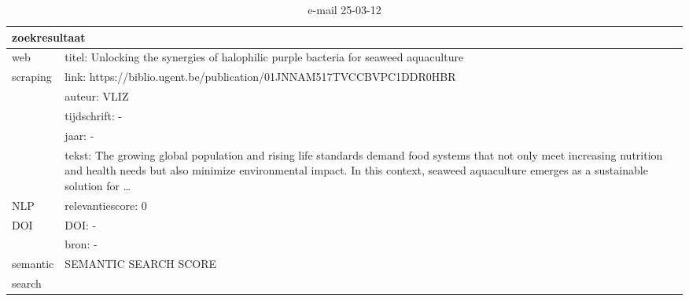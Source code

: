 \begin{table}[h!]
    \caption{e-mail 25-03-12}
    \centering
    \begin{tabularx}{\textwidth}{|p{4cm}|X|} 
        \hline
        \multicolumn{2}{|X|}{\textbf{zoekresultaat}} \\
        \hline
        web &titel: Unlocking the synergies of halophilic purple bacteria for seaweed aquaculture\\
        scraping&link: https://biblio.ugent.be/publication/01JNNAM517TVCCBVPC1DDR0HBR\\
        &auteur: VLIZ\\
        &tijdschrift: -\\
        &jaar: -\\
        &tekst: The growing global population and rising life standards demand food systems that not only meet increasing nutrition and health needs but also minimize environmental impact. In this context, seaweed aquaculture emerges as a sustainable solution for …\\
        \hline
        NLP&relevantiescore: 0\\
        \hline
        DOI&DOI: -\\
        &bron: -\\
        \hline
        semantic&SEMANTIC SEARCH SCORE\\
        search&\\
        \hline
    \end{tabularx}
    \label{table:email20250312}
\end{table}
